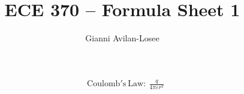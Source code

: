 \documentclass{article}
\title{ECE 370 -- Formula Sheet 1}
\author{Gianni Avilan-Losee}
\begin{document}
\begin{align*}
	&\mathrm{Coulomb's \ Law:} \ \frac{q}{4\pi\varepsilon r^2}
\end{align*}
\end{document}
